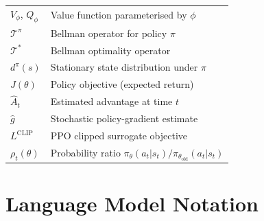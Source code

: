 \begin{center}
\begin{tabular}{@{}ll@{}}
$V_\phi$, $Q_\phi$  & Value function parameterised by $\phi$ \\
$\mathcal{T}^\pi$   & Bellman operator for policy $\pi$ \\
$\mathcal{T}^*$     & Bellman optimality operator \\
$d^\pi(s)$          & Stationary state distribution under $\pi$ \\
$J(\theta)$         & Policy objective (expected return) \\
$\hat{A}_t$         & Estimated advantage at time $t$ \\
$\hat{g}$           & Stochastic policy-gradient estimate \\
$L^\mathrm{CLIP}$   & PPO clipped surrogate objective \\
$\rho_t(\theta)$    & Probability ratio $\pi_\theta(a_t|s_t)/\pi_{\theta_\mathrm{old}}(a_t|s_t)$ \\
\bottomrule
\end{tabular}
\end{center}

\section*{Language Model Notation}

